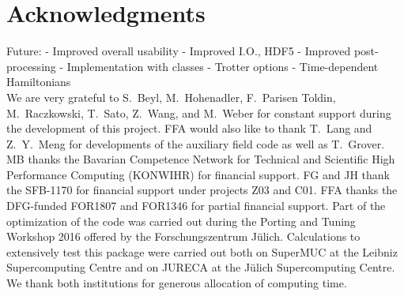 

\section*{Acknowledgments} 


Future: - Improved overall usability
- Improved I.O., HDF5
- Improved post-processing
- Implementation with classes
- Trotter options
- Time-dependent Hamiltonians\\

We are very grateful to  S.~Beyl, M.~Hohenadler,  F.~Parisen Toldin,  M.~Raczkowski, T.~Sato, Z.~Wang, and M.~Weber  for constant support during the development of this project.
FFA would also like to thank T.~Lang   and Z.~Y.~Meng for  developments of the auxiliary field code as well as T.~Grover. 
MB thanks the Bavarian Competence Network for Technical and Scientific High Performance Computing (KONWIHR) for financial support. FG  and JH thank the SFB-1170 for  financial support under projects Z03 and C01.  FFA thanks the DFG-funded FOR1807 and FOR1346 for partial financial support.
Part of the optimization of the code was carried out during  the  Porting and Tuning Workshop 2016 offered by the Forschungszentrum J\"ulich.
Calculations  to extensively test this package were carried out both on  SuperMUC at the  Leibniz Supercomputing Centre and on  JURECA  \cite{Jureca16} at the J\"ulich Supercomputing Centre.  We thank both institutions for generous allocation of computing time.
